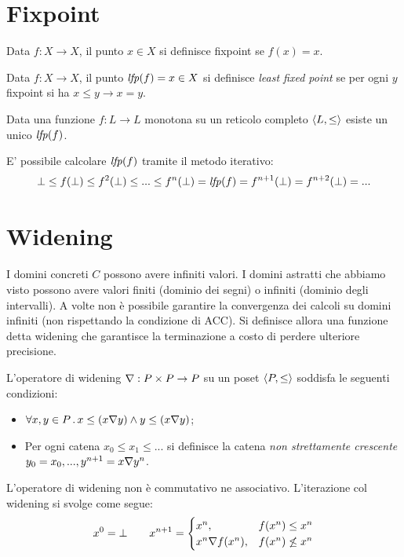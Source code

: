 \section{Fixpoint}\label{sec:fixpoint}

\begin{definition}[Fixpoint]
Data $f:X \to X$, il punto $x \in X$ si definisce fixpoint se $f(x) = x$.
\end{definition}

\begin{definition}
Data $f:X \to X$, il punto $\mathit{lfp}(f) = x \in X$ si definisce \emph{least fixed point} se per ogni $y$ fixpoint si ha $x \le y \to x = y$.
\end{definition}

\begin{theorem}
Data una funzione $f:L \to L$ monotona su un reticolo completo $\langle L, \le \rangle$ esiste un unico $\mathit{lfp}(f)$.
\end{theorem}

E' possibile calcolare $\mathit{lfp}(f)$ tramite il metodo iterativo:
$$\bot \le f(\bot) \le f^2(\bot) \le ... \le f^n(\bot) = \mathit{lfp}(f) = f^{n+1}(\bot) = f^{n+2}(\bot) = ...$$

\section{Widening}

I domini concreti $C$ possono avere infiniti valori. I domini astratti che abbiamo visto possono avere valori finiti (dominio dei segni) o infiniti (dominio degli intervalli). A volte non è possibile garantire la convergenza dei calcoli su domini infiniti (non rispettando la condizione di ACC). Si definisce allora una funzione detta widening che garantisce la terminazione a costo di perdere ulteriore precisione.

\begin{definition}
L'operatore di widening $\wide: P \times P \to P$ su un poset $\langle P, \le \rangle$ soddisfa le seguenti condizioni:
\begin{itemize}
    \item $\forall x,y \in P \, . \, x \le (\wide[x][y]) \land y \le (\wide[x][y])$;
    \item Per ogni catena $x_0 \le x_1 \le ...$ si definisce la catena \emph{non strettamente crescente} $y_0 = x_0, ..., y^{n+1} = \wide[x][y^n]$.
\end{itemize}
\end{definition}

L'operatore di widening non è commutativo ne associativo. L'iterazione col widening si svolge come segue:
$$x^0 = \bot \qquad x^{n+1} = \begin{cases} 
    x^n,                & f(x^n) \le x^n \\ 
    \wide[x^n][f(x^n)], & f(x^n) \not\le x^n \\
\end{cases}$$

